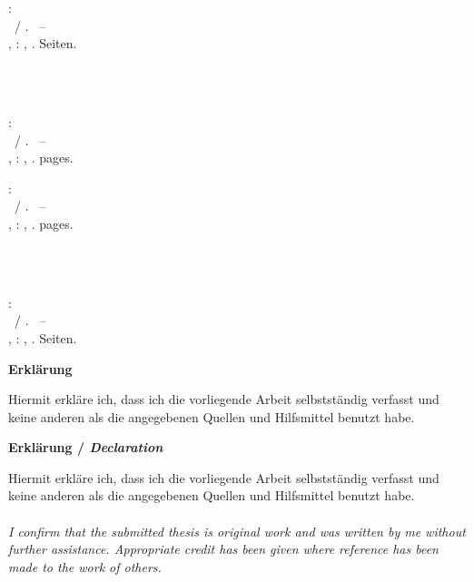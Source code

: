 \null\newpage
\thispagestyle{empty}

\newcommand{\hsmabibde}{\begin{small}\textbf{\hsmaautorbib}: \\ \hsmatitelde \ / \hsmaautor. \ -- \\ \hsmatypde, \hsmaort : \hsmakoerperschaftde, \hsmajahr. \pageref{TotPages} Seiten.\end{small}}

\newcommand{\hsmabiben}{\begin{small}\textbf{\hsmaautorbib}: \\ \hsmatitelen \ / \hsmaautor. \ -- \\ \hsmatypen, \hsmaort : \hsmakoerperschaften, \hsmajahr. \pageref{TotPages} pages. \end{small}}

%
  {\hsmabibde \\ \vspace{0.5cm} \\ \hsmabiben}
  {\hsmabiben \\ \vspace{0.5cm} \\ \hsmabibde}

\clearpage\setcounter{page}{1}
\thispagestyle{empty}
{
  \textsf{\large\textbf{Erklärung}}

  Hiermit erkläre ich, dass ich die vorliegende Arbeit selbstständig verfasst und keine anderen als die angegebenen Quellen und Hilfsmittel benutzt habe.
}
{
  \textsf{\large\textbf{Erklärung / \textit{Declaration}}}

  Hiermit erkläre ich, dass ich die vorliegende Arbeit selbstständig verfasst und keine anderen als die angegebenen Quellen und Hilfsmittel benutzt habe.
  \\ \\
  \textit{
    I confirm that the submitted thesis is original work and was written by me without further assistance. Appropriate credit has been given where reference has been made to the work of others.}
}

%
{
}{}%

